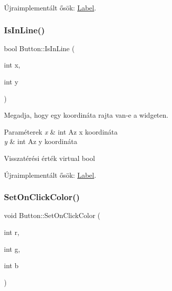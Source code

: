 Újraimplementált ősök\+: \hyperlink{class_label_a5cf04da7def075453b5c0fda93a1b575}{Label}.

\mbox{\label{class_button_a61832186fb0cf58c4c1c6fbbe572b61c}} 
\subsubsection{\texorpdfstring{Is\+In\+Line()}{IsInLine()}}
{\footnotesize\ttfamily bool Button\+::\+Is\+In\+Line (\begin{DoxyParamCaption}\item[{int}]{x,  }\item[{int}]{y }\end{DoxyParamCaption})\hspace{0.3cm}{\ttfamily [virtual]}}



Megadja, hogy egy koordináta rajta van-\/e a widgeten. 


\begin{DoxyParams}{Paraméterek}
{\em x} & int Az x koordináta \\
\hline
{\em y} & int Az y koordináta \\
\hline
\end{DoxyParams}
\begin{DoxyReturn}{Visszatérési érték}
virtual bool 
\end{DoxyReturn}


Újraimplementált ősök\+: \hyperlink{class_label_a918ebb45dbaa5484643355cf5ab4be47}{Label}.

\mbox{\label{class_button_aa9bb1fc7a079ef575f255f9c7e4fcfbb}} 
\subsubsection{\texorpdfstring{Set\+On\+Click\+Color()}{SetOnClickColor()}}
{\footnotesize\ttfamily void Button\+::\+Set\+On\+Click\+Color (\begin{DoxyParamCaption}\item[{int}]{r,  }\item[{int}]{g,  }\item[{int}]{b }\end{DoxyParamCaption})}



